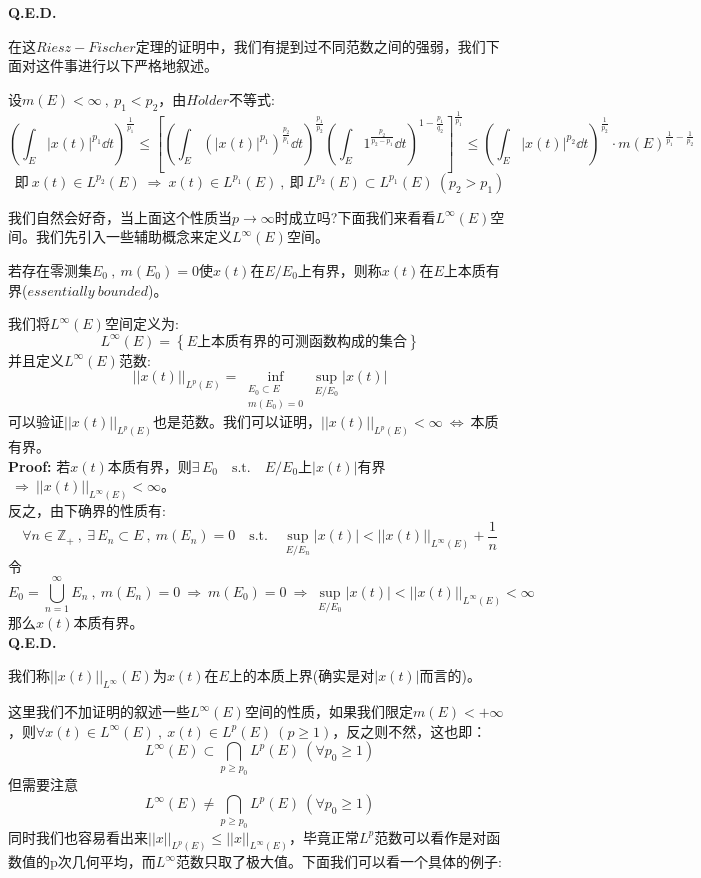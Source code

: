 \textbf{Q.E.D.}

在这$Riesz-Fischer$定理的证明中，我们有提到过不同范数之间的强弱，我们下面对这件事进行以下严格地叙述。

设$m(E)<\infty \ , \ p_1<p_2$，由$H\ddot{o}lder$不等式:
\[\left(\int_E|x(t)|^{p_1}\dd t\right)^{\frac{1}{p_1}} \leq \left[\left(\int_E\left(|x(t)|^{p_1}\right)^{\frac{p_2}{p_1}}\dd t\right)^{\frac{p_1}{p_2}}\left(\int_E1^{\frac{p_2}{p_2-p_1}}\dd t\right)^{1-\frac{p_1}{q_2}}\right]^{\frac{1}{p_1}} \leq \left(\int_E|x(t)|^{p_2}\dd t\right)^{\frac{1}{p_2}} \cdot m(E)^{\frac{1}{p_1}-\frac{1}{p_2}}\]
\[\text{即} \ x(t) \in L^{p_2}(E) \ \Rightarrow \ x(t) \in L^{p_1}(E) \ , \ \text{即} \ L^{p_2}(E) \subset L^{p_1}(E) \ (p_2>p_1)\]

我们自然会好奇，当上面这个性质当$p \to \infty$时成立吗?下面我们来看看$L^{\infty}(E)$空间。我们先引入一些辅助概念来定义$L^{\infty}(E)$空间。
\begin{definition}[本质有界]
    若存在零测集$E_0 \ , \ m(E_0)=0$使$x(t)$在$E/E_0$上有界，则称$x(t)$在$E$上本质有界($essentially \ bounded$)。
\end{definition}
我们将$L^{\infty}(E)$空间定义为:
\[L^{\infty}(E)=\left\{E\text{上本质有界的可测函数构成的集合}\right\}\]
并且定义$L^{\infty}(E)$范数:
\[||x(t)||_{L^p(E)}=\mathop \text{inf}\limits_{\substack{E_0 \subset E \\ m(E_0)=0}}\mathop \text{sup}\limits_{E/E_0}|x(t)|\]
可以验证$||x(t)||_{L^p(E)}$也是范数。我们可以证明，$||x(t)||_{L^p(E)}<\infty \ \Leftrightarrow \ $本质有界。\\
\textbf{Proof:} 若$x(t)$本质有界，则$\exists \, E_0 \quad \text{s.t.} \quad E/E_0$上$|x(t)|$有界$ \ \Rightarrow \ ||x(t)||_{L^{\infty}(E)}<\infty$。\\
反之，由下确界的性质有:
\[\forall n \in \mathbb{Z}_+ \ , \ \exists \,E_n \subset E \ , \ m(E_n)=0 \quad \text{s.t.} \quad \mathop \text{sup}\limits_{E/E_n}|x(t)|<||x(t)||_{L^{\infty}(E)}+\frac{1}{n}\]
令
\[E_0=\bigcup_{n=1}^{\infty}E_n \ , \ m(E_n)=0 \ \Rightarrow \ m(E_0)=0 \ \Rightarrow \ \mathop \text{sup}\limits_{E/E_0}|x(t)|<||x(t)||_{L^{\infty}(E)}<\infty\]
那么$x(t)$本质有界。\\
\textbf{Q.E.D.}
\begin{definition}[本质上界] \label{infty}
    我们称$||x(t)||_{L^{\infty}} (E)$为$x(t)$在$E$上的本质上界(确实是对$|x(t)|$而言的)。
\end{definition}
这里我们不加证明的叙述一些$L^{\infty}(E)$空间的性质，如果我们限定$m(E)<+\infty$，则$\forall x(t) \in L^{\infty}(E) \ , \ x(t) \in L^p(E) \ (p \geq 1)$，反之则不然，这也即：
\[L^{\infty}(E) \subset \bigcap_{p \geq p_0}L^{p}(E) \ (\forall p_0 \geq 1)\]
但需要注意
\[L^{\infty}(E) \neq \bigcap_{p \geq p_0}L^{p}(E) \ (\forall p_0 \geq 1)\]
同时我们也容易看出来$||x||_{L^p(E)} \leq ||x||_{L^{\infty}(E)}$，毕竟正常$L^p$范数可以看作是对函数值的p次几何平均，而$L^{\infty}$范数只取了极大值。下面我们可以看一个具体的例子:
